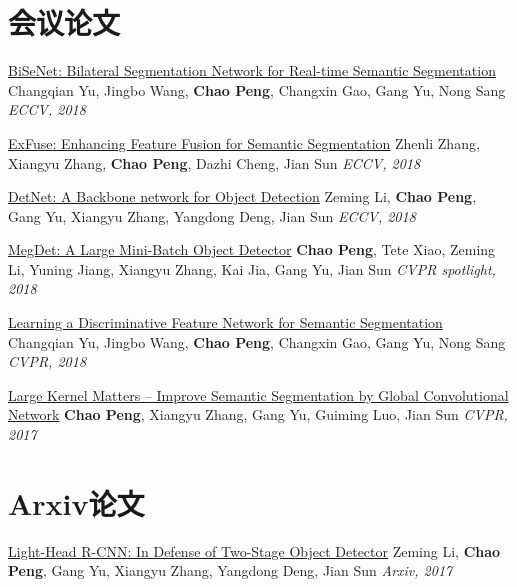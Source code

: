 \documentclass[]{friggeri-cv}
\begin{document}
\section{会议论文}
\href{}{BiSeNet: Bilateral Segmentation Network for Real-time Semantic Segmentation}\newline
Changqian Yu, Jingbo Wang, \textbf{Chao Peng}, Changxin Gao, Gang Yu, Nong Sang\newline
\emph{ECCV, 2018}

\href{https://arxiv.org/pdf/1804.03821.pdf}{ExFuse: Enhancing Feature Fusion for Semantic Segmentation}\newline
Zhenli Zhang, Xiangyu Zhang, \textbf{Chao Peng}, Dazhi Cheng, Jian Sun\newline
\emph{ECCV, 2018}

\href{https://arxiv.org/pdf/1804.06215.pdf}{DetNet: A Backbone network for Object Detection} \newline
Zeming Li, \textbf{Chao Peng}, Gang Yu, Xiangyu Zhang, Yangdong Deng, Jian Sun  \newline
\emph{ECCV, 2018}

\href{https://arxiv.org/pdf/1711.07240.pdf}{MegDet: A Large Mini-Batch Object Detector\qquad } \newline
\textbf{Chao Peng}, Tete Xiao, Zeming Li, Yuning Jiang, Xiangyu Zhang, Kai Jia, Gang Yu, \newline
Jian Sun \newline
\emph{CVPR spotlight, 2018}

\href{https://arxiv.org/pdf/1804.09337.pdf}{Learning a Discriminative Feature Network for Semantic Segmentation}\newline
Changqian Yu, Jingbo Wang, \textbf{Chao Peng}, Changxin Gao, Gang Yu, Nong Sang
\newline
\emph{CVPR, 2018}

\href{https://arxiv.org/pdf/1703.02719.pdf}{Large Kernel Matters -- Improve Semantic Segmentation by Global Convolutional Network}
\textbf{Chao Peng}, Xiangyu Zhang, Gang Yu, Guiming Luo, Jian Sun \newline
\emph{CVPR, 2017}

\section{Arxiv论文}
\href{https://arxiv.org/pdf/1711.07264.pdf}{Light-Head R-CNN: In Defense of Two-Stage Object Detector} \newline
Zeming Li, \textbf{Chao Peng}, Gang Yu, Xiangyu Zhang, Yangdong Deng, Jian Sun  \newline
\emph{Arxiv, 2017}
\end{document}
